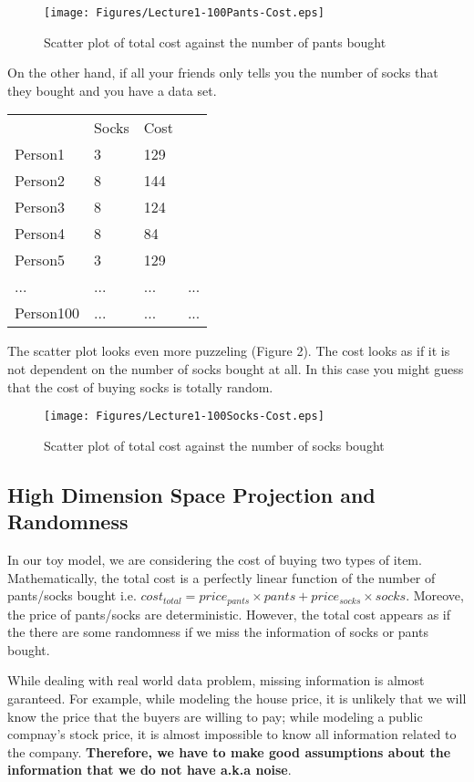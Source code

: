 \documentclass[12pt, oneside]{article}
\begin{document}
\begin{figure}
\center
\texttt{[image: Figures/Lecture1-100Pants-Cost.eps]}
\caption{Scatter plot of total cost against the number of pants bought}
\end{figure}

On the other hand, if all your friends only tells you the number of socks that they bought and you have a data set. 

\vspace{.1in}
\begin{tabular}{llll}
 &Socks   &Cost  \\
Person1 &3 &129\\
Person2 &8	&144\\
Person3 &8	&124\\
Person4 &8	&84\\
Person5 &3	&129\\
... & ... &... &...\\
Person100 & ...&...&...
\end{tabular}
\vspace{.1in}

The scatter plot looks even more puzzeling (Figure 2). The cost looks as if it is not dependent on the number of socks bought at all. In this case you might guess that the cost of buying socks is totally random.
\begin{figure}
\center
\texttt{[image: Figures/Lecture1-100Socks-Cost.eps]}
\caption{Scatter plot of total cost against the number of socks bought}
\end{figure}
\subsection{High Dimension Space Projection and Randomness}
In our toy model, we are considering the cost of buying two types of item. Mathematically, the total cost is a perfectly linear function of the number of pants/socks bought i.e. $cost_{total}=price_{pants} \times pants+ price_{socks} \times socks$. Moreove, the price of pants/socks are deterministic. However, the total cost appears as if the there are some randomness if we miss the information of socks or pants bought.

While dealing with real world data problem, missing information is almost garanteed. For example, while modeling the house price, it is unlikely that we will know the price that the buyers are willing to pay; while modeling a public compnay's stock price, it is almost impossible to know all information related to the company. \textbf{Therefore, we have to make good assumptions about the information that we do not have a.k.a noise}. 
\end{document}
